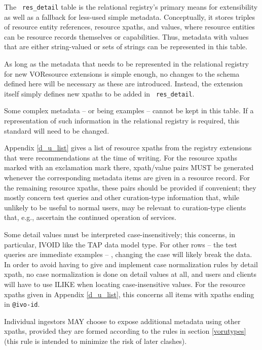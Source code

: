 \documentclass[11pt,a4paper]{ivoa}
\newcommand{\rtent}[1]{\texttt{\color{rtcolor} #1}}
\begin{document}
The \rtent{res\_detail} table is the relational registry's primary means for
extensibility as well as a fallback for less-used simple
metadata.  Conceptually, it stores triples of resource entity
references, resource xpaths,
and values, where resource entities can be resource records themselves
or capabilities.  Thus, metadata with values that are either
string-valued or sets of strings can be represented in this table.

As long as the metadata that needs to be represented in the
relational registry for new VOResource extensions is simple enough, no changes to the schema defined
here will be necessary as these are introduced.  Instead, the extension itself simply defines
new xpaths to be added in \rtent{res\_detail}.

Some complex metadata --  or
 being examples -- cannot be kept in this table.
If a representation of such information in the relational registry is
required, this standard will need to be changed.

Appendix \ref{d_u_list} gives a list
of resource xpaths from the registry extensions
that were recommendations at the time of writing.  
For the resource xpaths marked with an exclamation mark there,
xpath/value pairs MUST be generated whenever the corresponding
metadata items are given in a resource record.
For the remaining resource xpaths, these pairs should be provided if
convenient; they mostly concern test queries and other curation-type
information that, while unlikely to be useful to normal users, may be
relevant to curation-type clients that, e.g., ascertain the continued 
operation of services.

Some detail values must be interpreted case-insensitively; this
concerns, in particular, IVOID like the TAP data model type.  For other
rows -- the test queries are immediate examples -- , changing the case
will likely break the data.  In order to avoid having to give and
implement case normalization rules by detail xpath, no case normalization 
is done on detail values at all, and users and clients will have to use
ILIKE when locating
case-insensitive values.  For the resource xpaths given in Appendix \ref{d_u_list}, this concerns all items with xpaths ending
in \texttt{@ivo-id}.

Individual
ingestors
MAY choose to expose additional metadata using other xpaths, provided
they are formed according to the rules in 
section \ref{vorutypes} (this rule is intended
to minimize the risk of later clashes).
\end{document}
